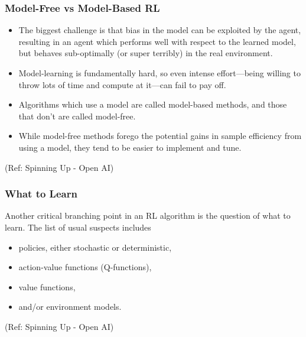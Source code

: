 \begin{frame}[fragile]\frametitle{Model-Free vs Model-Based RL}

\begin{itemize}
\item The biggest challenge is that bias in the model can be exploited by the agent, resulting in an agent which performs well with respect to the learned model, but behaves sub-optimally (or super terribly) in the real environment. 
\item Model-learning is fundamentally hard, so even intense effort—being willing to throw lots of time and compute at it—can fail to pay off.
\item Algorithms which use a model are called model-based methods, and those that don’t are called model-free. 
\item While model-free methods forego the potential gains in sample efficiency from using a model, they tend to be easier to implement and tune.
\end{itemize}

{\tiny (Ref: Spinning Up - Open AI)}
\end{frame}

\begin{frame}[fragile]\frametitle{What to Learn}

Another critical branching point in an RL algorithm is the question of what to learn. The list of usual suspects includes


\begin{itemize}
\item policies, either stochastic or deterministic,
\item action-value functions (Q-functions),
\item value functions,
\item and/or environment models.
\end{itemize}

{\tiny (Ref: Spinning Up - Open AI)}
\end{frame}

